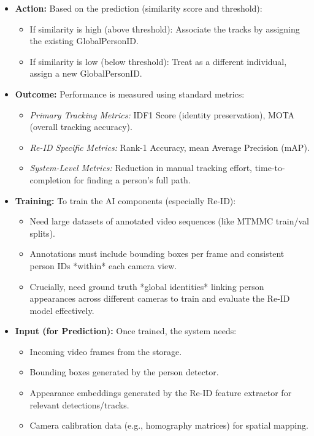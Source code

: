 \begin{itemize}
    \item \textbf{Action:} Based on the prediction (similarity score and threshold):
        \begin{itemize}
            \item If similarity is high (above threshold): Associate the tracks by assigning the existing GlobalPersonID.
            \item If similarity is low (below threshold): Treat as a different individual, assign a new GlobalPersonID.
        \end{itemize}

    \item \textbf{Outcome:} Performance is measured using standard metrics:
        \begin{itemize}
            \item \textit{Primary Tracking Metrics:} IDF1 Score (identity preservation), MOTA (overall tracking accuracy).
            \item \textit{Re-ID Specific Metrics:} Rank-1 Accuracy, mean Average Precision (mAP).
            \item \textit{System-Level Metrics:} Reduction in manual tracking effort, time-to-completion for finding a person's full path.
        \end{itemize}

    \item \textbf{Training:} To train the AI components (especially Re-ID):
        \begin{itemize}
            \item Need large datasets of annotated video sequences (like MTMMC train/val splits).
            \item Annotations must include bounding boxes per frame and consistent person IDs *within* each camera view.
            \item Crucially, need ground truth *global identities* linking person appearances across different cameras to train and evaluate the Re-ID model effectively.
        \end{itemize}

    \item \textbf{Input (for Prediction):} Once trained, the system needs:
        \begin{itemize}
            \item Incoming video frames from the storage.
            \item Bounding boxes generated by the person detector.
            \item Appearance embeddings generated by the Re-ID feature extractor for relevant detections/tracks.
            \item Camera calibration data (e.g., homography matrices) for spatial mapping.
        \end{itemize}


\end{itemize}
